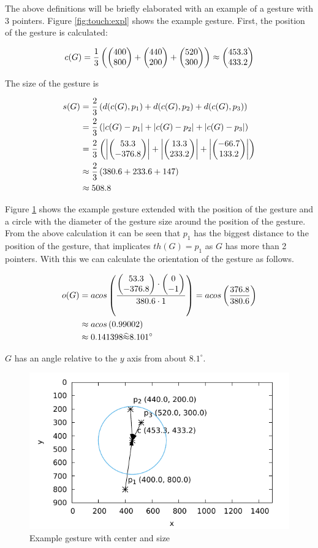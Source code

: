 The above definitions will be briefly elaborated with an example of a gesture with 3 pointers. Figure \ref{fig:touch:expl} shows the example gesture. First, the position of the gesture is calculated:

\begin{equation*}
c(G) = \frac{1}{3}\left( \left( \begin{matrix} 400 \\ 800 \end{matrix} \right) + \left( \begin{matrix} 440 \\ 200 \end{matrix} \right) + \left( \begin{matrix} 520 \\ 300 \end{matrix} \right) \right) \approx \left( \begin{matrix} 453.3 \\ 433.2 \end{matrix} \right)
\end{equation*}

The size of the gesture is

\begin{align*}
s(G) &= \frac{2}{3}\left( d(c(G), p_1) + d(c(G), p_2) + d(c(G), p_3) \right) \\
&= \frac{2}{3}\left( \left|c(G) - p_1\right| + \left| c(G) - p_2 \right| + \left| c(G) - p_3 \right| \right) \\
&= \frac{2}{3}\left( \left| \left( \begin{matrix} 53.3 \\ -376.8 \end{matrix} \right) \right| + \left| \left( \begin{matrix} 13.3 \\ 233.2 \end{matrix} \right) \right| + \left| \left( \begin{matrix} -66.7 \\ 133.2 \end{matrix} \right) \right| \right)	\\
&\approx \frac{2}{3}\left( 380.6 + 233.6 + 147 \right)\\
&\approx 508.8
\end{align*}

Figure \ref{fig:touch:expl_res} shows the example gesture extended with the position of the gesture and a circle with the diameter of the gesture size around the position of the gesture. From the above calculation it can be seen that $p_1$ has the biggest distance to the position of the gesture, that implicates $th(G) = p_1$ as $G$ has more than 2 pointers. With this we can calculate the orientation of the gesture as follows.

\begin{align*}
o(G) &= acos\left( \frac{\left( \begin{matrix} 53.3 \\ -376.8 \end{matrix} \right) \cdot \left( \begin{matrix} 0 \\ -1 \end{matrix} \right)}{380.6 \cdot 1} \right) = acos\left( \frac{376.8}{380.6} \right) \\
&\approx acos\left( 0.99002 \right) \\
&\approx 0.141398 \widehat{\approx} 8.101 ^\circ
\end{align*}

$G$ has an angle relative to the $y$ axis from about $8.1^\circ$.

\begin{figure}
	\caption{\label{fig:touch:expl_res}Example gesture with center and size}
	\includegraphics{assets/chpt_concepts/gestures/3pointers_center.pdf}
\end{figure}

